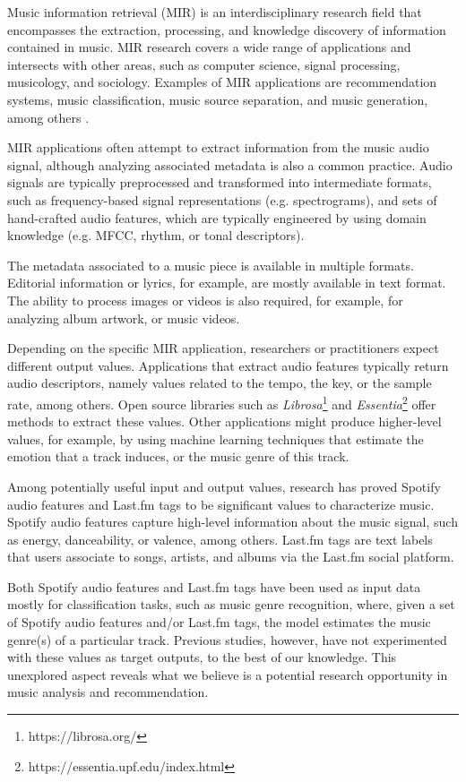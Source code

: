 \documentclass[sn-mathphys]{sn-jnl}%
\theoremstyle{thmstyleone}%
\theoremstyle{thmstyletwo}%
\theoremstyle{thmstylethree}%
\begin{document}
Music information retrieval (MIR) is an interdisciplinary research field that encompasses the extraction,
processing, and knowledge discovery of information contained in music.
MIR research covers a wide range of applications and intersects with other areas, such as computer science, signal processing, musicology, and sociology.
Examples of MIR applications are recommendation systems, music classification,
music source separation, and music generation, among others \cite{ramirez2020machine}.

MIR applications often attempt to extract information from the music audio signal,
although analyzing associated metadata is also a common practice.
Audio signals are typically preprocessed and transformed into intermediate formats, such as frequency-based signal representations (e.g. spectrograms),
and sets of hand-crafted audio features, which are typically engineered by using domain knowledge (e.g. MFCC, rhythm, or tonal descriptors).

The metadata associated to a music piece is available in multiple formats.
Editorial information or lyrics, for example, are mostly available in text format.
The ability to process images or videos is also required, for example, for analyzing album artwork, or music videos.

Depending on the specific MIR application, researchers or practitioners expect different output values.
Applications that extract audio features typically return audio descriptors, namely values related to the tempo, the key, or the sample rate, among others.
Open source libraries such as \emph{Librosa}\footnote[1]{https://librosa.org/} 
and \emph{Essentia}\footnote[2]{https://essentia.upf.edu/index.html} offer methods to extract these values.
Other applications might produce higher-level values, for example, by using machine learning techniques
that estimate the emotion that a track induces, or the music genre of this track.

Among potentially useful input and output values, research has proved Spotify audio features and Last.fm tags to be significant values to characterize music.
Spotify audio features capture high-level information about the music signal,
such as energy, danceability, or valence, among others.
Last.fm tags are text labels that users associate to songs, artists, and albums via the Last.fm social platform.

Both Spotify audio features and Last.fm tags have been used as input data mostly for classification tasks, such as music genre recognition,
where, given a set of Spotify audio features and/or Last.fm tags, the model estimates the music genre(s) of a particular track.
Previous studies, however, have not experimented with these values as target outputs, to the best of our knowledge.
This unexplored aspect reveals what we believe is a potential research opportunity in music analysis and recommendation.
\end{document}
